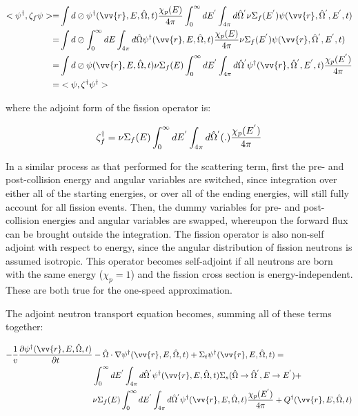 \documentclass[10pt]{article}
\newcommand{\hO}{\hat{\Omega}}
\newcommand{\spa}{(\vv{r}, E, \hO, t)}
\begin{document}
\begin{flushleft}
\begin{enumerate}
\begin{equation}
\begin{aligned}
<\psi^\dagger,\zeta_f\psi>=& \int d\oslash\psi^\dagger\spa \frac{\chi_p(E)}{4\pi}\int_0^\infty dE^{'}\int_{4\pi}d\hO  ^{'}\nu\Sigma_f(E^{'})\psi(\vv{r},\hO  ^{'},E^{'},t)\\
=& \int d\oslash\int_0^\infty dE\int_{4\pi}d\hO  \psi^\dagger\spa \frac{\chi_p(E)}{4\pi}\nu\Sigma_f(E^{'})\psi(\vv{r},\hO  ^{'},E^{'},t)\\
=& \int d\oslash\psi\spa \nu\Sigma_f(E)\int_0^\infty dE^{'}\int_{4\pi}d\hO  ^{'}\psi^\dagger(\vv{r},\hO  ^{'},E^{'},t)\frac{\chi_p(E^{'})}{4\pi}\\
=& <\psi,\zeta^\dagger\psi^\dagger>\\
\end{aligned}
\end{equation}

where the adjoint form of the fission operator is:

\begin{equation}
\zeta_f^\dagger=\nu\Sigma_f(E)\int_0^\infty dE^{'}\int_{4\pi}d\hO  ^{'}(.)\frac{\chi_p(E^{'})}{4\pi}\\
\end{equation}

In a similar process as that performed for the scattering term, first the pre- and post-collision energy and angular variables are switched, since integration over either all of the starting energies, or over all of the ending energies, will still fully account for all fission events. Then, the dummy variables for pre- and post-collision energies and angular variables are swapped, whereupon the forward flux can be brought outside the integration. The fission operator is also non-self adjoint with respect to energy, since the angular distribution of fission neutrons is assumed isotropic. This operator becomes self-adjoint if all neutrons are born with the same energy (\(\chi_p=1\)) and the fission cross section is energy-independent. These are both true for the one-speed approximation.
\end{enumerate}

The adjoint neutron transport equation becomes, summing all of these terms together:

\begin{equation} %
\begin{aligned}
-\frac{1}{v}\frac{\partial\psi^\dagger\spa }{\partial t}
& -\hO  \cdot\nabla\psi^\dagger\spa 
+\Sigma_t\psi^\dagger\spa =\\
& \int_0^\infty dE^{'}\int_{4\pi}d\hO  ^{'}\psi^\dagger\spa \Sigma_s(\hO  \rightarrow\hO  ^{'}, E\rightarrow E^{'})+\\
& \nu\Sigma_f(E)\int_0^\infty dE^{'}\int_{4\pi}d\hO  ^{'}\psi^\dagger\spa \frac{\chi_p(E^{'})}{4\pi} + Q^\dagger\spa \\
\end{aligned}
\end{equation}


\end{flushleft}
\end{document}
